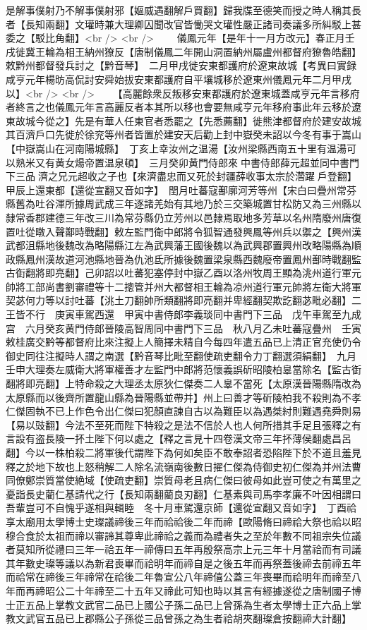 是解事僕射乃不解事僕射邪【嫗威遇翻解戶買翻】歸我牒至德笑而授之時人稱其長者【長知兩翻】文瓘時兼大理卿囚聞改官皆慟哭文瓘性嚴正諸司奏議多所糾駁上甚委之【駁比角翻】<br />
<br />
　　儀鳳元年【是年十一月方改元】春正月壬戌徙冀王輪為相王納州獠反【唐制儀鳳二年開山洞置納州屬盧州都督府獠魯皓翻】敕黔州都督發兵討之【黔音琴】　二月甲戌徙安東都護府於遼東故城【考異曰實録咸亨元年楊昉高侃討安舜始拔安東都護府自平壤城移於遼東州儀鳳元年二月甲戌以】<br />
<br />
　　【高麗餘衆反叛移安東都護府於遼東城蓋咸亨元年言移府者終言之也儀鳳元年言高麗反者本其所以移也會要無咸亨元年移府事此年云移於遼東故城今從之】先是有華人任東官者悉罷之【先悉薦翻】徙熊津都督府於建安故城其百濟戶口先徙於徐兖等州者皆置於建安天后勸上封中嶽癸未詔以今冬有事于嵩山【中嶽嵩山在河南陽城縣】　丁亥上幸汝州之温湯【汝州梁縣西南五十里有温湯可以熟米又有黄女煬帝置温泉頓】　三月癸卯黄門侍郎來中書侍郎薛元超並同中書門下三品濟之兄元超收之子也【來濟盡忠而又死於封疆薛收事太宗於濳躍戶登翻】　甲辰上還東都【還從宣翻又音如字】　閏月吐蕃寇鄯廓河芳等州【宋白曰疊州常芬縣舊為吐谷渾所據周武成三年逐諸羌始有其地乃於三交築城置甘松防又為三州縣以隸常香郡建德三年改三川為常芬縣仍立芳州以邑隸焉取地多芳草以名州隋廢州唐復置吐從暾入聲鄯時戰翻】敕左監門衛中郎將令狐智通發興鳳等州兵以禦之【興州漢武都沮縣地後魏改為略陽縣江左為武興藩王國後魏以為武興郡置興州改略陽縣為順政縣鳳州漢故道河池縣地晉為仇池氐所據後魏置梁泉縣西魏廢帝置鳳州鄯時戰翻監古衘翻將即亮翻】己卯詔以吐蕃犯塞停封中嶽乙酉以洛州牧周王顯為洮州道行軍元帥將工部尚書劉審禮等十二摠管并州大都督相王輪為凉州道行軍元帥將左衛大將軍契苾何力等以討吐蕃【洮土刀翻帥所類翻將即亮翻并卑經翻契欺訖翻苾毗必翻】二王皆不行　庚寅車駕西還　甲寅中書侍郎李義琰同中書門下三品　戊午車駕至九成宫　六月癸亥黄門侍郎晉陵高智周同中書門下三品　秋八月乙未吐蕃寇疊州　壬寅敕桂廣交黔等都督府比來注擬上人簡擇未精自今每四年遣五品已上清正官充使仍令御史同往注擬時人謂之南選【黔音琴比毗至翻使疏吏翻令力丁翻選須絹翻】　九月壬申大理奏左威衛大將軍權善才左監門中郎將范懷義誤斫昭陵柏辠當除名【監古衘翻將即亮翻】上特命殺之大理丞太原狄仁傑奏二人辠不當死【太原漢晉陽縣隋改為太原縣而以後齊所置龍山縣為晉陽縣並帶并】州上曰善才等斫陵柏我不殺則為不孝仁傑固執不已上作色令出仁傑曰犯顏直諫自古以為難臣以為遇桀紂則難遇堯舜則易【易以豉翻】今法不至死而陛下特殺之是法不信於人也人何所措其手足且張釋之有言設有盗長陵一抔土陛下何以處之【釋之言見十四卷漢文帝三年抔薄侯翻處昌呂翻】今以一株柏殺二將軍後代謂陛下為何如矣臣不敢奉詔者恐陷陛下於不道且羞見釋之於地下故也上怒稍解二人除名流嶺南後數日擢仁傑為侍御史初仁傑為并州法曹同僚鄭崇質當使絶域【使疏吏翻】崇質母老且病仁傑曰彼母如此豈可使之有萬里之憂詣長史藺仁基請代之行【長知兩翻藺良刃翻】仁基素與司馬李孝廉不叶因相謂曰吾輩豈可不自愧乎遂相與輯睦　冬十月車駕還京師【還從宣翻又音如字】　丁酉祫享太廟用太學博士史璨議禘後三年而祫祫後二年而禘【歐陽脩曰禘祫大祭也祫以昭穆合食於太祖而禘以審諦其尊卑此禘祫之義而為禮者失之至於年數不同祖宗失位議者莫知所從禮曰三年一祫五年一禘傳曰五年再殷祭高宗上元三年十月當祫而有司議其年數史璨等議以為新君喪畢而祫明年而禘自是之後五年而再祭蓋後禘去前禘五年而祫常在禘後三年禘常在祫後二年魯宣公八年禘僖公蓋三年喪畢而祫明年而禘至八年而再禘昭公二十年禘至二十五年又禘此可知也時以其言有經據遂從之唐制國子博士正五品上掌教文武官二品已上國公子孫二品已上曾孫為生者太學博士正六品上掌教文武官五品已上郡縣公子孫從三品曾孫之為生者祫胡夾翻璨倉按翻禘大計翻】　